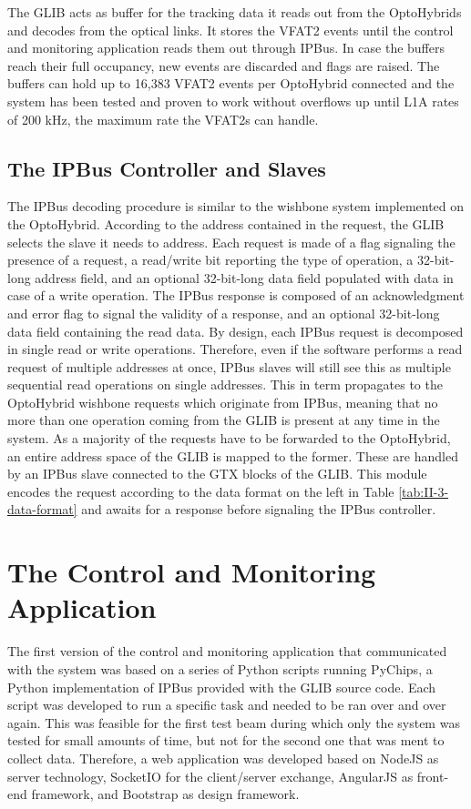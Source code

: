       The GLIB acts as buffer for the tracking data it reads out from the OptoHybrids and decodes from the optical links. It stores the VFAT2 events until the control and monitoring application reads them out through IPBus. In case the buffers reach their full occupancy, new events are discarded and flags are raised. The buffers can hold up to 16,383 VFAT2 events per OptoHybrid connected and the system has been tested and proven to work without overflows up until L1A rates of 200 kHz, the maximum rate the VFAT2s can handle.

    \subsection{The IPBus Controller and Slaves}

      The IPBus decoding procedure is similar to the wishbone system implemented on the OptoHybrid. According to the address contained in the request, the GLIB selects the slave it needs to address. Each request is made of a flag signaling the presence of a request, a read/write bit reporting the type of operation, a 32-bit-long address field, and an optional 32-bit-long data field populated with data in case of a write operation. The IPBus response is composed of an acknowledgment and error flag to signal the validity of a response, and an optional 32-bit-long data field containing the read data. By design, each IPBus request is decomposed in single read or write operations. Therefore, even if the software performs a read request of multiple addresses at once, IPBus slaves will still see this as multiple sequential read operations on single addresses. This in term propagates to the OptoHybrid wishbone requests which originate from IPBus, meaning that no more than one operation coming from the GLIB is present at any time in the system. As a majority of the requests have to be forwarded to the OptoHybrid, an entire address space of the GLIB is mapped to the former. These are handled by an IPBus slave connected to the GTX blocks of the GLIB. This module encodes the request according to the data format on the left in Table \ref{tab:II-3-data-format} and awaits for a response before signaling the IPBus controller.

  \section{The Control and Monitoring Application}

    The first version of the control and monitoring application that communicated with the system was based on a series of Python scripts running PyChips, a Python implementation of IPBus provided with the GLIB source code. Each script was developed to run a specific task and needed to be ran over and over again. This was feasible for the first test beam during which only the system was tested for small amounts of time, but not for the second one that was ment to collect data. Therefore, a web application was developed based on NodeJS \cite{NODEJS} as server technology, SocketIO \cite{SOCKETIO} for the client/server exchange, AngularJS \cite{ANGULARJS} as front-end framework, and Bootstrap \cite{BOOTSTRAP} as design framework.

